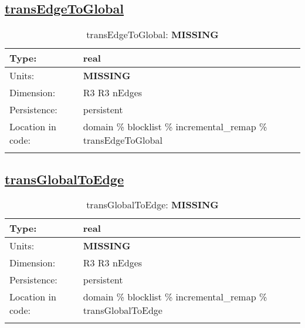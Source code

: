 \subsection[transEdgeToGlobal]{\hyperref[sec:var_tab_incremental_remap]{transEdgeToGlobal}}
\label{subsec:var_sec_incremental_remap_transEdgeToGlobal}
\begin{center}
\begin{longtable}{| p{2.0in} | p{4.0in} |}
        \hline 
        Type: & real \\
        \hline 
        Units: & {\bf \color{red} MISSING} \\
        \hline 
        Dimension: & R3 R3 nEdges \\
        \hline 
        Persistence: & persistent \\
        \hline 
         Location in code: & domain \% blocklist \% incremental\_remap \% transEdgeToGlobal \\
         \hline 
    \caption{transEdgeToGlobal: {\bf \color{red} MISSING}}
\end{longtable}
\end{center}
\subsection[transGlobalToEdge]{\hyperref[sec:var_tab_incremental_remap]{transGlobalToEdge}}
\label{subsec:var_sec_incremental_remap_transGlobalToEdge}
\begin{center}
\begin{longtable}{| p{2.0in} | p{4.0in} |}
        \hline 
        Type: & real \\
        \hline 
        Units: & {\bf \color{red} MISSING} \\
        \hline 
        Dimension: & R3 R3 nEdges \\
        \hline 
        Persistence: & persistent \\
        \hline 
         Location in code: & domain \% blocklist \% incremental\_remap \% transGlobalToEdge \\
         \hline 
    \caption{transGlobalToEdge: {\bf \color{red} MISSING}}
\end{longtable}
\end{center}

